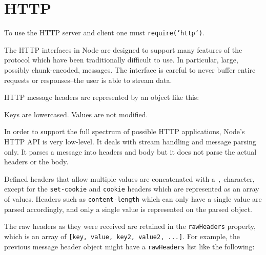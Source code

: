 \section{HTTP}\label{http}

\begin{Shaded}
\begin{Highlighting}[]
 
\end{Highlighting}
\end{Shaded}

To use the HTTP server and client one must \texttt{require('http')}.

The HTTP interfaces in Node are designed to support many features of the
protocol which have been traditionally difficult to use. In particular,
large, possibly chunk-encoded, messages. The interface is careful to
never buffer entire requests or responses--the user is able to stream
data.

HTTP message headers are represented by an object like this:

\begin{Shaded}
\begin{Highlighting}[]
\NormalTok{\{ }\NormalTok{: }\NormalTok{,}
  \NormalTok{: }\NormalTok{,}
  \NormalTok{: }\NormalTok{,}
  \NormalTok{: }\NormalTok{,}
  \NormalTok{: } \NormalTok{\}}
\end{Highlighting}
\end{Shaded}

Keys are lowercased. Values are not modified.

In order to support the full spectrum of possible HTTP applications,
Node's HTTP API is very low-level. It deals with stream handling and
message parsing only. It parses a message into headers and body but it
does not parse the actual headers or the body.

Defined headers that allow multiple values are concatenated with a
\texttt{,} character, except for the \texttt{set-cookie} and
\texttt{cookie} headers which are represented as an array of values.
Headers such as \texttt{content-length} which can only have a single
value are parsed accordingly, and only a single value is represented on
the parsed object.

The raw headers as they were received are retained in the
\texttt{rawHeaders} property, which is an array of
\texttt{{[}key, value, key2, value2, ...{]}}. For example, the previous
message header object might have a \texttt{rawHeaders} list like the
following:

